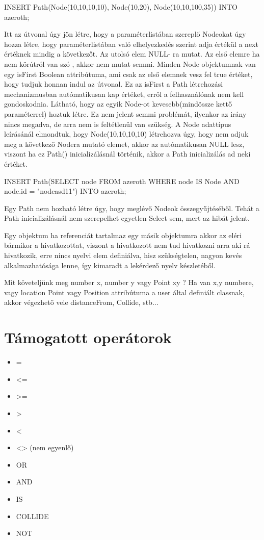 \begin{itemize}
\begin{sql}
INSERT Path(Node(10,10,10,10), Node(10,20), Node(10,10,100,35)) INTO azeroth;
\end{sql}

Itt az útvonal úgy jön létre, hogy a paraméterlistában szereplő Nodeokat úgy hozza létre, hogy paraméterlistában való elhelyezkedés szerint adja értékül a next értéknek mindig a következőt. Az utolsó elem NULL- ra mutat. Az első elemre ha nem körútról van szó , akkor nem mutat semmi. Minden Node objektumnak van egy isFirst Boolean attribútuma, ami csak az első elemnek vesz fel true értéket, hogy tudjuk honnan indul az útvonal. Ez az isFirst a Path létrehozási mechanizmusban autómatikusan kap értéket, erről a felhasználónak nem kell gondoskodnia.
Látható, hogy az egyik Node-ot kevesebb(mindössze kettő paraméterrel) hoztuk létre. Ez nem jelent semmi problémát, ilyenkor az irány nincs megadva, de arra nem is feltétlenül van szükség.
A Node adattípus leírásánál elmondtuk, hogy Node(10,10,10,10) létrehozva úgy, hogy nem adjuk meg a következő Nodera mutató elemet, akkor az autómatikusan NULL lesz, viszont ha ez Path() inicializálásnál történik, akkor a Path inicializálás ad neki értéket.

\begin{sql}
INSERT Path(SELECT node FROM azeroth WHERE node IS Node AND node.id = "nodeasd11") INTO azeroth;
\end{sql}

Egy Path nem hozható létre úgy, hogy  meglévő Nodeok összegyűjtéséből. Tehát a Path inicializálásnál nem szerepelhet egyetlen Select sem, mert az hibát jelent.

Egy objektum ha referenciát tartalmaz egy másik objektumra akkor az eléri bármikor a hivatkozottat, viszont a hivatkozott nem tud hivatkozni arra aki rá hivatkozik, erre nincs nyelvi elem definiálva, hisz szükségtelen, nagyon kevés alkalmazhatósága lenne, így kimaradt a lekérdező nyelv készletéből.

Mit követeljünk meg number x, number y vagy Point xy ?
Ha van x,y numbere, vagy location Point vagy Position attribútuma a user által definiált classnak, akkor végezhető vele distanceFrom, Collide, stb...

\end{itemize}

\section{Támogatott operátorok}
\begin{itemize}
\item = 
\item <= 
\item >= 
\item > 
\item < 
\item <> (nem egyenlő) 
\item OR 
\item AND 
\item IS 
\item COLLIDE
\item NOT
\end{itemize}

